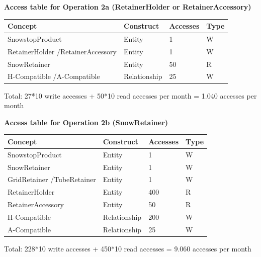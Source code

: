 \documentclass{article}[h]
\begin{document}
{\vspace{12px}

{\centering \textbf{Access table for Operation 2a (RetainerHolder or RetainerAccessory)}\\}
\begin{table}[H]
  \def\arraystretch{1.10}%
  \centering
  \begin{tabular}{ | m{4cm} | m{4cm}| m{3cm} | m{2cm} |} 
    \hline
    {\textbf{\large Concept}} & {\textbf{\large Construct}} & {\textbf{\large Accesses}} & {\textbf{\large Type}} \\
    \hline
    \color[HTML]{3531FF} SnowstopProduct & Entity & 1 & W \\ 
    \hline
    \color[HTML]{3531FF} RetainerHolder /\newline RetainerAccessory & Entity & 1 & W \\ 
    \hline
    \color[HTML]{3531FF} SnowRetainer & Entity & 50 & R \\ 
    \hline
    \color[HTML]{3531FF} H-Compatible /\newline A-Compatible & Relationship & 25 & W \\ 
    \hline
  \end{tabular}
\end{table}
Total: 27*10 write accesses + 50*10 read accesses per month = 1.040 accesses per month

\vspace{12px}

{\centering \textbf{Access table for Operation 2b (SnowRetainer)}\\}
\begin{table}[H]
  \def\arraystretch{1.10}%
  \centering
  \begin{tabular}{ | m{4cm} | m{4cm}| m{3cm} | m{2cm} |} 
    \hline
    {\textbf{\large Concept}} & {\textbf{\large Construct}} & {\textbf{\large Accesses}} & {\textbf{\large Type}} \\
    \hline
    \color[HTML]{3531FF} SnowstopProduct & Entity & 1 & W \\ 
    \hline
    \color[HTML]{3531FF} SnowRetainer & Entity & 1 & W \\ 
    \hline
    \color[HTML]{3531FF} GridRetainer /\newline TubeRetainer & Entity & 1 & W \\ 
    \hline
    \color[HTML]{3531FF} RetainerHolder & Entity & 400 & R \\ 
    \hline
    \color[HTML]{3531FF} RetainerAccessory & Entity & 50 & R \\ 
    \hline
    \color[HTML]{3531FF} H-Compatible & Relationship & 200 & W \\ 
    \hline
    \color[HTML]{3531FF} A-Compatible & Relationship & 25 & W \\ 
    \hline
  \end{tabular}
\end{table}
Total: 228*10 write accesses + 450*10 read accesses = 9.060 accesses per month

}
\end{document}
